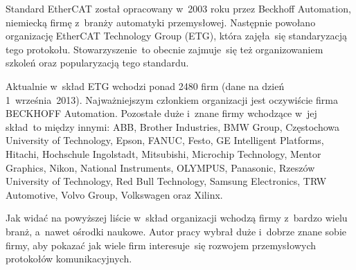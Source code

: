 Standard EtherCAT został opracowany w~2003 roku przez Beckhoff Automation, niemiecką firmę z~branży automatyki przemysłowej. Następnie powołano organizację EtherCAT Technology Group (ETG), która zajęła~się standaryzacją tego protokołu. Stowarzyszenie~to obecnie zajmuje~się też organizowaniem szkoleń oraz popularyzacją tego standardu. 

Aktualnie w~skład ETG wchodzi ponad 2480 firm (dane na dzień 1~września~2013). Najważniejszym członkiem organizacji jest oczywiście firma BECKHOFF Automation. Pozostałe duże i~znane firmy wchodzące w~jej skład~to między innymi: ABB, Brother Industries, BMW Group, Częstochowa University of Technology, Epson, FANUC, Festo, GE Intelligent Platforms, Hitachi, Hochschule Ingolstadt, Mitsubishi, Microchip Technology, Mentor Graphics, Nikon, National Instruments, OLYMPUS, Panasonic, Rzeszów University of Technology, Red Bull Technology, Samsung Electronics, TRW Automotive, Volvo Group, Volkswagen oraz Xilinx.

Jak widać na powyższej liście w~skład organizacji wchodzą firmy z~bardzo wielu branż, a~nawet ośrodki naukowe. Autor pracy wybrał duże i~dobrze znane sobie firmy, aby pokazać jak wiele firm interesuje~się rozwojem przemysłowych protokołów komunikacyjnych.

\subsubsection{}
\subsubsection{}
